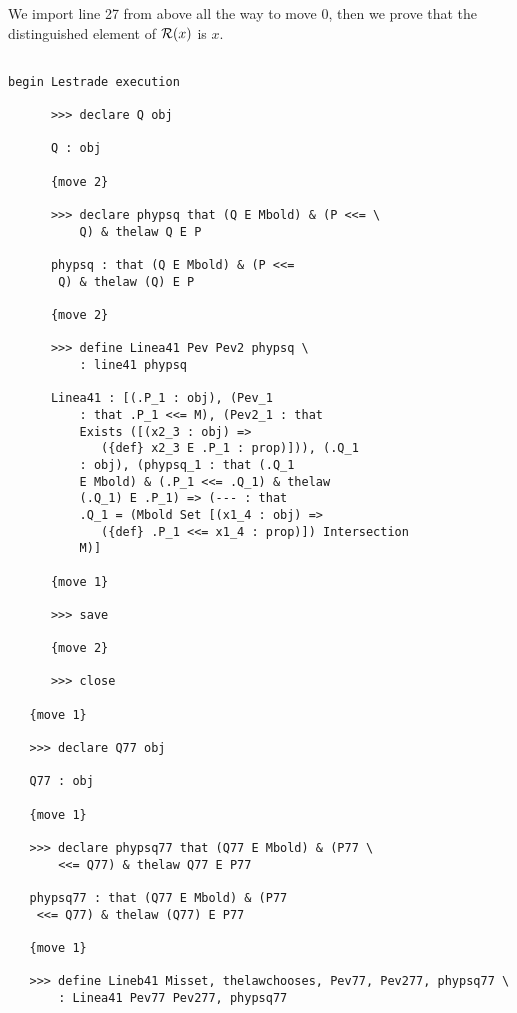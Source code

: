 \documentclass[12pt]{article}
\begin{document}
We import line 27 from above all the way to move 0, then we prove that the distinguished element of ${\cal R}(x)$ is $x$.

\begin{verbatim}

begin Lestrade execution

      >>> declare Q obj

      Q : obj

      {move 2}

      >>> declare phypsq that (Q E Mbold) & (P <<= \
          Q) & thelaw Q E P

      phypsq : that (Q E Mbold) & (P <<= 
       Q) & thelaw (Q) E P

      {move 2}

      >>> define Linea41 Pev Pev2 phypsq \
          : line41 phypsq

      Linea41 : [(.P_1 : obj), (Pev_1 
          : that .P_1 <<= M), (Pev2_1 : that 
          Exists ([(x2_3 : obj) => 
             ({def} x2_3 E .P_1 : prop)])), (.Q_1 
          : obj), (phypsq_1 : that (.Q_1 
          E Mbold) & (.P_1 <<= .Q_1) & thelaw 
          (.Q_1) E .P_1) => (--- : that 
          .Q_1 = (Mbold Set [(x1_4 : obj) => 
             ({def} .P_1 <<= x1_4 : prop)]) Intersection 
          M)]

      {move 1}

      >>> save

      {move 2}

      >>> close

   {move 1}

   >>> declare Q77 obj

   Q77 : obj

   {move 1}

   >>> declare phypsq77 that (Q77 E Mbold) & (P77 \
       <<= Q77) & thelaw Q77 E P77

   phypsq77 : that (Q77 E Mbold) & (P77 
    <<= Q77) & thelaw (Q77) E P77

   {move 1}

   >>> define Lineb41 Misset, thelawchooses, Pev77, Pev277, phypsq77 \
       : Linea41 Pev77 Pev277, phypsq77


\end{verbatim}
\end{document}
